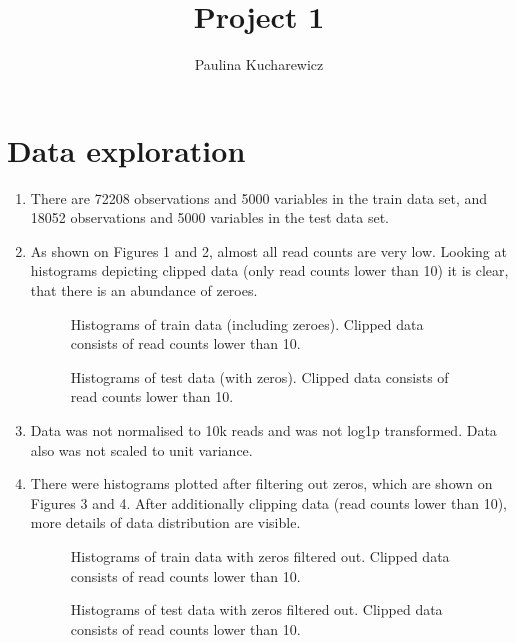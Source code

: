 \documentclass[12pt]{article}
\title{Project 1}
\author{Paulina Kucharewicz}
\begin{document}
\maketitle

\section{Data exploration}

\begin{enumerate}
\item There are 72208 observations and 5000 variables in the train data set, and 18052 observations and 5000 variables in the test data set.

\item As shown on Figures 1 and 2, almost all read counts are very low. Looking at histograms depicting clipped data (only read counts lower than 10) it is clear, that there is an abundance of zeroes.
\begin{figure}[H]
  \centering
  
  \caption{Histograms of train data (including zeroes). Clipped data consists of read counts lower than 10.}
\end{figure}

\begin{figure}[H]
  \centering
  
  \caption{Histograms of test data (with zeros). Clipped data consists of read counts lower than 10.}
\end{figure}

\item Data was not normalised to 10k reads and was not log1p transformed. Data also was not scaled to unit variance.

\item  There were histograms plotted after filtering out zeros, which are shown on Figures 3 and 4. After additionally clipping data (read counts lower than 10), more details of data distribution are visible.
\begin{figure}[H]
  \centering
  
  \caption{Histograms of train data with zeros filtered out. Clipped data consists of read counts lower than 10.}
\end{figure}

\begin{figure}[H]
  \centering
  
  \caption{Histograms of test data with zeros filtered out. Clipped data consists of read counts lower than 10.}
\end{figure}


\end{enumerate}
\end{document}
